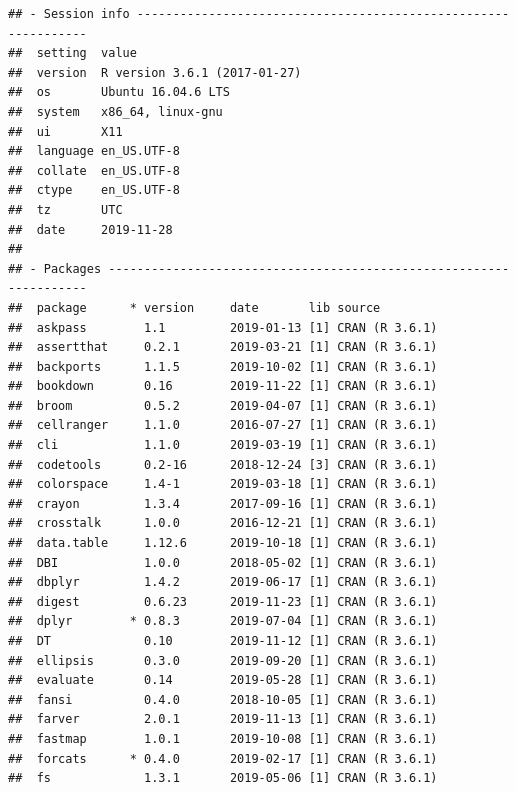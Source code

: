 \documentclass[]{book}
\begin{document}
\begin{verbatim}
## - Session info ---------------------------------------------------------------
##  setting  value                       
##  version  R version 3.6.1 (2017-01-27)
##  os       Ubuntu 16.04.6 LTS          
##  system   x86_64, linux-gnu           
##  ui       X11                         
##  language en_US.UTF-8                 
##  collate  en_US.UTF-8                 
##  ctype    en_US.UTF-8                 
##  tz       UTC                         
##  date     2019-11-28                  
## 
## - Packages -------------------------------------------------------------------
##  package      * version     date       lib source                           
##  askpass        1.1         2019-01-13 [1] CRAN (R 3.6.1)                   
##  assertthat     0.2.1       2019-03-21 [1] CRAN (R 3.6.1)                   
##  backports      1.1.5       2019-10-02 [1] CRAN (R 3.6.1)                   
##  bookdown       0.16        2019-11-22 [1] CRAN (R 3.6.1)                   
##  broom          0.5.2       2019-04-07 [1] CRAN (R 3.6.1)                   
##  cellranger     1.1.0       2016-07-27 [1] CRAN (R 3.6.1)                   
##  cli            1.1.0       2019-03-19 [1] CRAN (R 3.6.1)                   
##  codetools      0.2-16      2018-12-24 [3] CRAN (R 3.6.1)                   
##  colorspace     1.4-1       2019-03-18 [1] CRAN (R 3.6.1)                   
##  crayon         1.3.4       2017-09-16 [1] CRAN (R 3.6.1)                   
##  crosstalk      1.0.0       2016-12-21 [1] CRAN (R 3.6.1)                   
##  data.table     1.12.6      2019-10-18 [1] CRAN (R 3.6.1)                   
##  DBI            1.0.0       2018-05-02 [1] CRAN (R 3.6.1)                   
##  dbplyr         1.4.2       2019-06-17 [1] CRAN (R 3.6.1)                   
##  digest         0.6.23      2019-11-23 [1] CRAN (R 3.6.1)                   
##  dplyr        * 0.8.3       2019-07-04 [1] CRAN (R 3.6.1)                   
##  DT             0.10        2019-11-12 [1] CRAN (R 3.6.1)                   
##  ellipsis       0.3.0       2019-09-20 [1] CRAN (R 3.6.1)                   
##  evaluate       0.14        2019-05-28 [1] CRAN (R 3.6.1)                   
##  fansi          0.4.0       2018-10-05 [1] CRAN (R 3.6.1)                   
##  farver         2.0.1       2019-11-13 [1] CRAN (R 3.6.1)                   
##  fastmap        1.0.1       2019-10-08 [1] CRAN (R 3.6.1)                   
##  forcats      * 0.4.0       2019-02-17 [1] CRAN (R 3.6.1)                   
##  fs             1.3.1       2019-05-06 [1] CRAN (R 3.6.1)                   

\end{verbatim}
\end{document}
